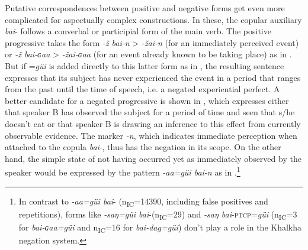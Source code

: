 \documentclass[output=paper,colorlinks,citecolor=brown,chinesefont]{langscibook}
\begin{document}
Putative correspondences between positive and negative forms get even more complicated for aspectually complex constructions. In these, the copular auxiliary \textit{bai}{}- follows a converbal or participial form of the main verb. The positive progressive takes the form \textit{-ž bai-n} > \textit{-žai-n} (for an immediately perceived event) or \textit{-ž bai-ɢaa} > \textit{-žai-ɢaa} (for an event already known to be taking place) as in . But if =\textit{güi} is added directly to this latter form as in , the resulting sentence expresses that its subject has never experienced the event in a period that ranges from the past until the time of speech, i.e. a negated experiential perfect. A better candidate for a negated progressive is shown in , which expresses either that speaker B has observed the subject for a period of time and seen that s/he doesn’t eat or that speaker B is drawing an inference to this effect from currently observable evidence. The marker \textit{-n}, which indicates immediate perception when attached to the copula \textit{bai}{}-, thus has the negation in its scope. On the other hand, the simple state of not having occurred yet as immediately observed by the speaker would be expressed by the pattern \textit{-aa=güi bai-n} as in .\footnote{In contrast to \textit{-aa=güi bai}{}- (n\textsubscript{IC}=14390, including false positives and repetitions), forms like \textit{\nobreakdash-saŋ=güi bai}-(n\textsubscript{IC}=29) and \textit{-saŋ bai}{}-\textsc{ptcp}=\textit{güi} (n\textsubscript{IC}=3 for \textit{bai-ɢaa=güi} and n\textsubscript{IC}=16 for \textit{bai-dag=güi}) don’t play a role in the Khalkha negation system.}
\end{document}
